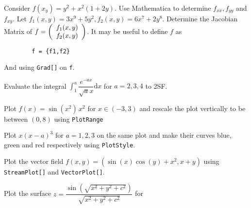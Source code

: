 \documentclass{exam}
\begin{document}
\begin{questions}
    \question Consider $f(x_y)=y^2+x^2(1+2y)$. Use Mathematica to determine $f_{xx},f_{yy}$ and $f_{xy}$.
    \question Let $f_1(x,y)=3x^9+5y^2, f_2(x,y)=6x^7+2y^8$. Determine the Jacobian Matrix of $f=\left(\begin{array}[1]{c} f_1(x,y) \\ f_2(x,y)\end{array}\right)$. It may be useful to define $f$ as 
    \begin{lstlisting}
        f = {f1,f2}
    \end{lstlisting}
    And using \lstinline[columns=fixed]{Grad[]} on \lstinline[columns=fixed]{f}.

    \question Evaluate the integral $\displaystyle\int_1^a \dfrac{e^{-ax}}{\sqrt{a}x}\mathrm{d}x$ for $a=2,3,4$ to 2SF.

    \question Plot $f(x)=\sin(x^2)\,x^2$ for $x\in(-3,3)$ and rescale the plot vertically to be between $(0,8)$ using \lstinline[columns=fixed]{PlotRange}

    \question Plot $x(x-a)^3$ for $a=1,2,3$ on the same plot and make their curves blue, green and red respectively using \lstinline[columns=fixed]{PlotStyle}.

    \question Plot the vector field $f(x,y)=(\sin(x)\cos(y)+x^2,x+y)$ using \lstinline[columns=fixed]{StreamPlot[]} and \lstinline[columns=fixed]{VectorPlot[]}.

    \question Plot the surface $z=\dfrac{\sin(\sqrt{x^2+y^2+c^2})}{\sqrt{x^2+y^2+c^2}}$ for
\end{questions}
\end{document}

